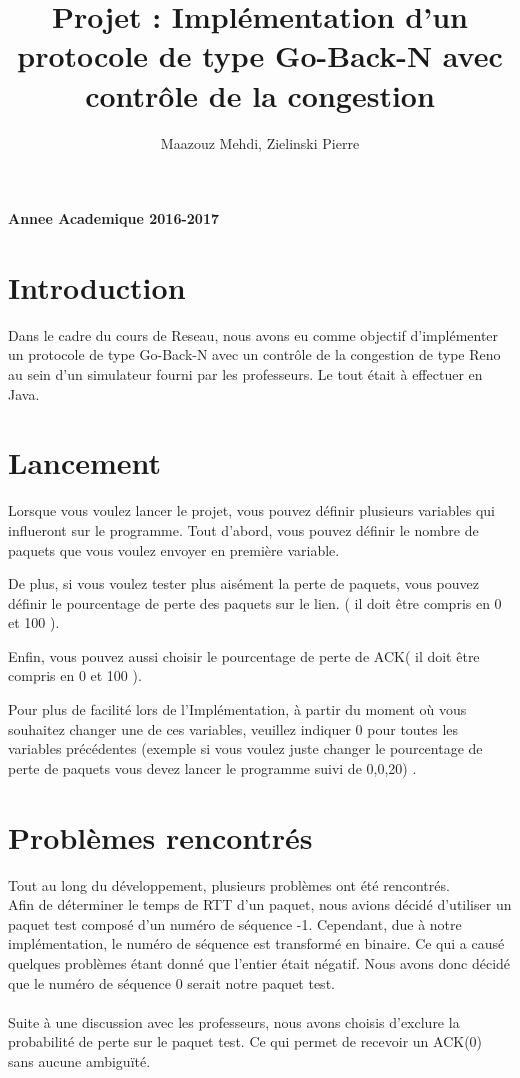 \documentclass[a4paper,10pt]{article}
\title{Projet : Implémentation d'un protocole de type Go-Back-N avec contrôle de la congestion}
\author{Maazouz Mehdi, Zielinski Pierre}
\begin{document}
\maketitle
\textbf{Annee Academique 2016-2017}\\
\tableofcontents
\newpage

\section{Introduction}
Dans le cadre du cours de Reseau, nous avons eu comme objectif d'implémenter un protocole de type Go-Back-N
avec un contrôle de la congestion de type Reno au sein d'un simulateur fourni par les professeurs. Le tout était 
à effectuer en Java.

\section{Lancement}
Lorsque vous voulez lancer le projet, vous pouvez définir plusieurs variables qui influeront sur le programme.
Tout d'abord, vous pouvez définir le nombre de paquets que vous voulez envoyer en première variable.

De plus, si vous voulez tester plus aisément la perte de paquets, vous pouvez définir le pourcentage de perte des paquets sur le lien.
( il doit être compris en 0 et 100 ).

Enfin, vous pouvez aussi choisir le pourcentage de perte de ACK( il doit être compris en 0 et 100 ).

Pour plus de facilité lors de l'Implémentation, à partir du moment où vous souhaitez changer une de ces variables, veuillez indiquer 0 pour toutes les variables précédentes (exemple si vous voulez juste changer le pourcentage de perte de paquets vous devez lancer le programme suivi de 0,0,20) .

\section{Problèmes rencontrés}
Tout au long du développement, plusieurs problèmes ont été rencontrés.\\
Afin de déterminer le temps de RTT d'un paquet, nous avions décidé d'utiliser un paquet test composé d'un numéro de séquence -1.
Cependant, due à notre implémentation, le numéro de séquence est transformé en binaire. Ce qui a causé quelques problèmes étant donné
que l'entier était négatif. Nous avons donc décidé que le numéro de séquence 0 serait notre paquet test.\\
\\
Suite à une discussion avec les professeurs, nous avons choisis d'exclure la probabilité de perte sur le paquet test.
Ce qui permet de recevoir un ACK(0) sans aucune ambiguïté.
\end{document}
